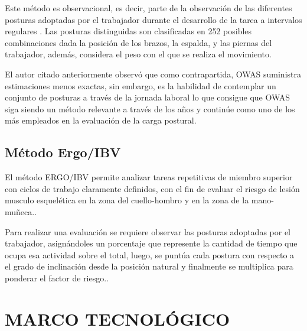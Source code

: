 Este método es observacional, es decir, parte de la observación de las diferentes posturas adoptadas por el trabajador durante el desarrollo de la tarea a intervalos regulares \parencite{Diego-Mas2015EvaluacionOWAS}. Las posturas distinguidas son clasificadas en 252 posibles combinaciones dada la posición de los brazos, la espalda, y las piernas del trabajador, además, considera el peso con el que se realiza el movimiento. 

El autor citado anteriormente observó que como contrapartida, OWAS suministra estimaciones menos exactas, sin embargo, es la habilidad de contemplar un conjunto de posturas a través de la jornada laboral lo que consigue que OWAS siga siendo un método relevante a través de los años y continúe como uno de los más empleados en la evaluación de la carga postural.
\subsection{Método Ergo/IBV}
El método ERGO/IBV permite analizar tareas repetitivas de miembro superior con ciclos de trabajo claramente definidos, con el fin de evaluar el riesgo de lesión musculo esquelética en la zona del cuello-hombro y en la zona de la mano-muñeca.\parencite{Nogareda2009TareasErgonomicos}.

Para realizar una evaluación se requiere observar las posturas adoptadas por el trabajador, asignándoles un porcentaje que represente la cantidad de tiempo que ocupa esa actividad sobre el total, luego, se puntúa cada postura con respecto a el grado de inclinación desde la posición natural y finalmente se multiplica para ponderar el factor de riesgo.\parencite{Nogareda2009TareasErgonomicos}.
\section{MARCO TECNOLÓGICO}